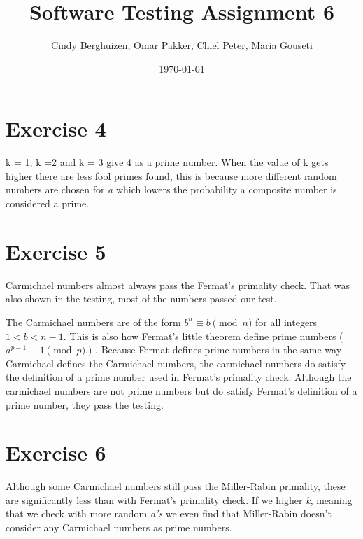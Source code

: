 \documentclass{article}
\begin{document}
\setlength{\parindent}{0cm}
\title{Software Testing Assignment 6}
\author{Cindy Berghuizen, Omar Pakker, Chiel Peter,  Maria Gouseti}
\date{\today}
\maketitle

\section*{Exercise 4}



k = 1, k =2 and k = 3 give 4 as a prime number. When the value of k gets higher there are less fool primes found, this is because more different random numbers are chosen for \emph{a} which lowers the probability a composite number is considered a prime. 

\vspace{0.5cm}
\section*{Exercise 5}



Carmichael numbers almost always pass the Fermat's primality check. That was also shown in the testing, most of the numbers passed our test.
 
The Carmichael numbers are of the form $ b^{n}\equiv b\pmod{n} $ for all integers $1<b<n-1 $. This is also how Fermat's little theorem define prime numbers ( $a^{p-1} \equiv 1 \pmod p.$) . Because Fermat defines prime numbers in the same way Carmichael defines the Carmichael numbers, the carmichael numbers do satisfy the definition of a prime number used in Fermat's primality check. Although the carmichael numbers are not prime numbers but do satisfy Fermat's definition of a prime number, they pass the testing.
\vspace{0.5cm}

\section*{Exercise 6}


Although some Carmichael numbers still pass the Miller-Rabin primality, these are significantly less than with Fermat's primality check. If we higher \emph{k}, meaning that we check with more random \emph{a's} we even find that Miller-Rabin doesn't consider any Carmichael numbers as prime numbers.
\end{document}
